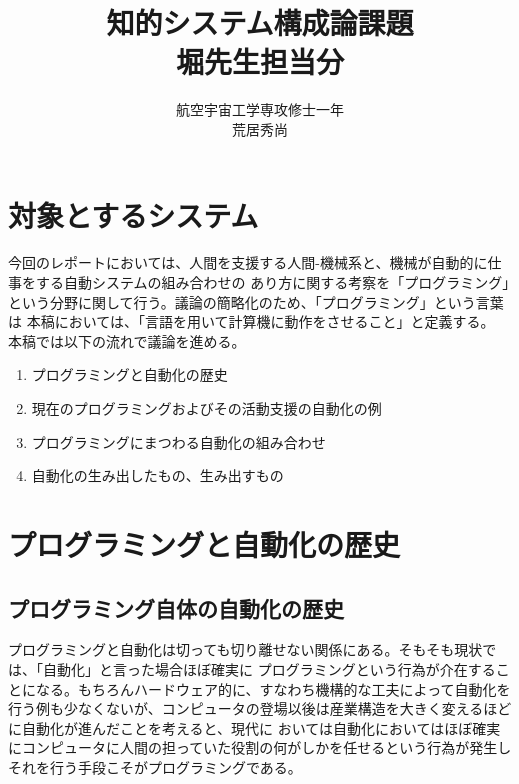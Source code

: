 \documentclass[10pt,a4paper]{ltjsarticle}       %
\title{知的システム構成論課題\\堀先生担当分}
\author{航空宇宙工学専攻修士一年\\荒居秀尚}
\begin{document}
\maketitle

\section{対象とするシステム}
今回のレポートにおいては、人間を支援する人間-機械系と、機械が自動的に仕事をする自動システムの組み合わせの
あり方に関する考察を「プログラミング」という分野に関して行う。議論の簡略化のため、「プログラミング」という言葉は
本稿においては、「言語を用いて計算機に動作をさせること」と定義する。\\

本稿では以下の流れで議論を進める。
\begin{enumerate}
  \item プログラミングと自動化の歴史
  \item 現在のプログラミングおよびその活動支援の自動化の例
  \item プログラミングにまつわる自動化の組み合わせ
  \item 自動化の生み出したもの、生み出すもの
\end{enumerate}
\section{プログラミングと自動化の歴史}
\subsection{プログラミング自体の自動化の歴史}
プログラミングと自動化は切っても切り離せない関係にある。そもそも現状では、「自動化」と言った場合ほぼ確実に
プログラミングという行為が介在することになる。もちろんハードウェア的に、すなわち機構的な工夫によって自動化を
行う例も少なくないが、コンピュータの登場以後は産業構造を大きく変えるほどに自動化が進んだことを考えると、現代に
おいては自動化においてはほぼ確実にコンピュータに人間の担っていた役割の何がしかを任せるという行為が発生し
それを行う手段こそがプログラミングである。\\
\end{document}
